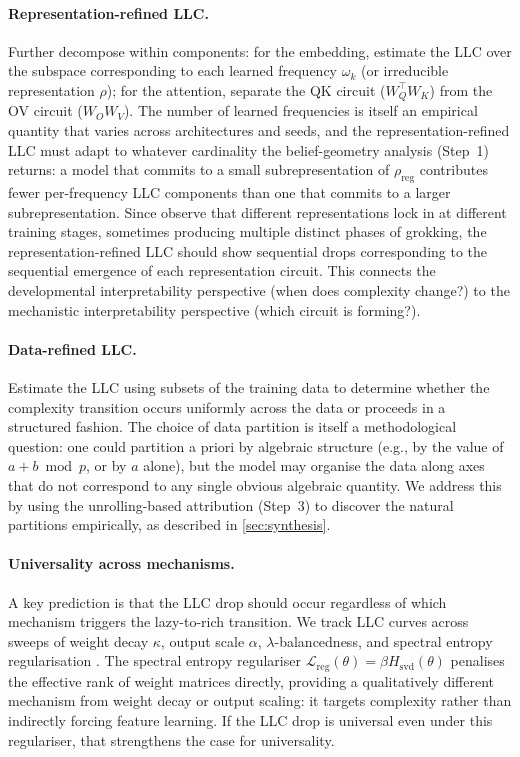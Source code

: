 \documentclass[11pt,a4paper]{article}
\begin{document}
\paragraph{Representation-refined LLC.} Further decompose within components: for the embedding, estimate the LLC over the subspace corresponding to each learned frequency $\omega_k$ (or irreducible representation $\rho$); for the attention, separate the QK circuit ($W_Q^\top W_K$) from the OV circuit ($W_O W_V$). The number of learned frequencies is itself an empirical quantity that varies across architectures and seeds, and the representation-refined LLC must adapt to whatever cardinality the belief-geometry analysis (Step~1) returns: a model that commits to a small subrepresentation of $\rho_{\mathrm{reg}}$ contributes fewer per-frequency LLC components than one that commits to a larger subrepresentation. Since \citet{chughtai2023toy} observe that different representations lock in at different training stages, sometimes producing multiple distinct phases of grokking, the representation-refined LLC should show sequential drops corresponding to the sequential emergence of each representation circuit. This connects the developmental interpretability perspective (when does complexity change?) to the mechanistic interpretability perspective (which circuit is forming?).

\paragraph{Data-refined LLC.} Estimate the LLC using subsets of the training data to determine whether the complexity transition occurs uniformly across the data or proceeds in a structured fashion. The choice of data partition is itself a methodological question: one could partition a priori by algebraic structure (e.g., by the value of $a + b \bmod p$, or by $a$ alone), but the model may organise the data along axes that do not correspond to any single obvious algebraic quantity. We address this by using the unrolling-based attribution (Step~3) to discover the natural partitions empirically, as described in \cref{sec:synthesis}.

\paragraph{Universality across mechanisms.} A key prediction is that the LLC drop should occur regardless of which mechanism triggers the lazy-to-rich transition. We track LLC curves across sweeps of weight decay $\kappa$, output scale $\alpha$, $\lambda$-balancedness, and spectral entropy regularisation \citep{demoss2025complexity}. The spectral entropy regulariser $\mathcal{L}_{\mathrm{reg}}(\theta) = \beta H_{\mathrm{svd}}(\theta)$ penalises the effective rank of weight matrices directly, providing a qualitatively different mechanism from weight decay or output scaling: it targets complexity rather than indirectly forcing feature learning. If the LLC drop is universal even under this regulariser, that strengthens the case for universality.
\end{document}
